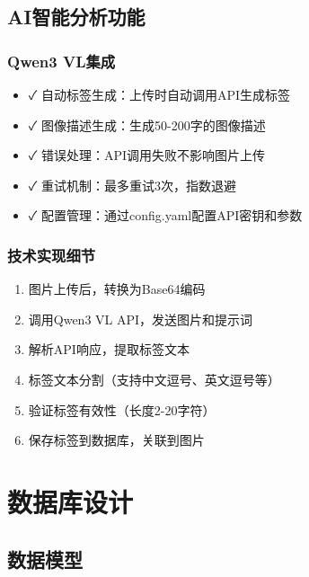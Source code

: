 \documentclass[12pt,a4paper]{article}
\newcommand{\feature}[1]{\textcolor{green!60!black}{✓ #1}}
\begin{document}
\subsection{AI智能分析功能}

\subsubsection{Qwen3 VL集成}
\begin{itemize}
    \item \feature{自动标签生成}：上传时自动调用API生成标签
    \item \feature{图像描述生成}：生成50-200字的图像描述
    \item \feature{错误处理}：API调用失败不影响图片上传
    \item \feature{重试机制}：最多重试3次，指数退避
    \item \feature{配置管理}：通过config.yaml配置API密钥和参数
\end{itemize}

\subsubsection{技术实现细节}
\begin{tcolorbox}[colback=blue!5!white,colframe=blue!75!black,title=AI标签生成流程]
\begin{enumerate}
    \item 图片上传后，转换为Base64编码
    \item 调用Qwen3 VL API，发送图片和提示词
    \item 解析API响应，提取标签文本
    \item 标签文本分割（支持中文逗号、英文逗号等）
    \item 验证标签有效性（长度2-20字符）
    \item 保存标签到数据库，关联到图片
\end{enumerate}
\end{tcolorbox}

\section{数据库设计}

\subsection{数据模型}
\end{document}
